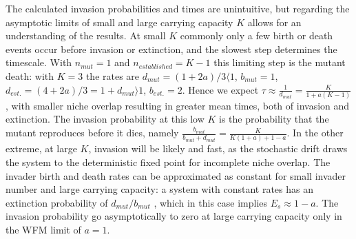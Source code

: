 The calculated invasion probabilities and times are unintuitive, but regarding the asymptotic limits of small and large carrying capacity $K$ allows for an understanding of the results. %
At small $K$ commonly only a few birth or death events occur before invasion or extinction, and the slowest step determines the timescale. 
With $n_{mut}=1$ and $n_{established}=K-1$ this limiting step is the mutant death: with $K=3$ the rates are $d_{mut}=(1+2a)/3\langle1$, $b_{mut}=1$, $d_{est.}=(4+2a)/3=1+d_{mut}\rangle1$, $b_{est.}=2$. 
Hence we expect $\tau \approx \frac{1}{d_{mut}}=\frac{K}{1+a(K-1)}$, 
with smaller niche overlap resulting in greater mean times, both of invasion and extinction. %
The invasion probability at this low $K$ is the probability that the mutant reproduces before it dies, namely $\frac{b_{mut}}{b_{mut}+d_{mut}} = \frac{K}{K(1+a)+1-a}$. 
%
In the other extreme, at large $K$, invasion will be likely and fast, as the stochastic drift draws the system to the deterministic fixed point for incomplete niche overlap. 
The invader birth and death rates can be approximated as constant for small invader number and large carrying capacity: a system with constant rates has an extinction probability of $d_{mut}/b_{mut}$ \cite{Allen2005,Allen2003}, which in this case implies $E_{s} \approx 1-a$. 
The invasion probability go asymptotically to zero at large carrying capacity only in the WFM limit of $a=1$. 

